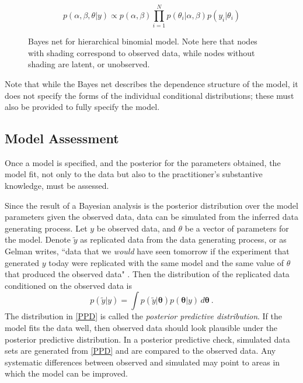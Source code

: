  \[ p(\alpha,\beta, \theta \vert y) \propto p(\alpha,\beta) \prod_{i = 1}^N p(\theta_i \vert \alpha, \beta) p(y_i\vert \theta_i)  \]

\begin{figure}[h!]

	\centering
	\caption[Hierarchical binomial model Bayes net]{Bayes net for hierarchical binomial model.  Note here that nodes with shading correspond to observed data, while nodes without shading are latent, or unobserved.}
	\label{bayesnet}
\end{figure}

\noindent Note that while the Bayes net describes the dependence structure of the model, it does not specify the forms of the individual conditional distributions; these must also be provided to fully specify the model.

\subsection{Model Assessment}

Once a model is specified, and the posterior for the parameters obtained, the model fit, not only to the data but also to the practitioner's substantive knowledge, must be assessed.  

\noindent Since the result of a Bayesian analysis is the posterior distribution over the model parameters given the observed data, data can be simulated from the inferred data generating process.  Let $ y $ be observed data, and $ \theta $ be a vector of parameters for the model.  Denote $ \tilde{y} $ as replicated data from the data generating process, or as Gelman writes, ``data that we \textit{would} have seen tomorrow if the experiment that generated $ y $ today were replicated with the same model and the same value of $ \theta $ that produced the observed data" \cite[page~145]{gelman2013bayesian}.  Then the distribution of the replicated data conditioned on the observed data is 
%
\begin{equation}\label{PPD}
	p(\tilde{y} \vert y) = \int p(\tilde{y} \vert \bm{\theta}) p(\bm{\theta} \vert y) \, d\bm{\theta}  \>.
\end{equation}
%
The distribution in \cref{PPD} is called the \textit{posterior predictive distribution}.  If the model fits the data well, then observed data should look plausible under the posterior predictive distribution. In a posterior predictive check, simulated data sets are generated from \cref{PPD} and are compared to the observed data.  Any systematic differences between observed and simulated may point to areas in which the model can be improved.

